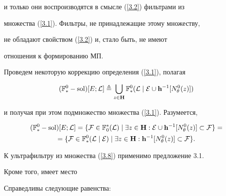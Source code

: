{и только они воспроизводятся в смысле (\ref{3.2}) фильтрами из


множества (\ref{3.1}). Фильтры, не принадлежащие этому множеству,


не обладают свойством (\ref{3.2}) и, стало быть, не имеют


отношения к формированию МП.





Проведем некоторую коррекцию определения (\ref{3.1}), полагая


\begin{equation}


\label{3.8}


({{\Bbb F}_*^0}-\sol)[E;{\cal L}] \triangleq


\bigcup\limits_{z \in {\bold H}}{{\Bbb F}_*^0}({\cal L}\mid{\cal


E}\cup{{\bold h}^{-1}}[{N_\theta^0}(z)])


\end{equation}


и получая при этом подмножество множества (\ref{3.1}). Разумеется,


\begin{multline}


\label{3.9}


({{\Bbb F}_*^0}-\sol)[E;{\cal L}] = \{{\cal F} \in {{\Bbb F}_0^*}({\cal


L}) \mid \exi{z} \in {\bold H}:{\cal E}\cup{{\bold h}^{-1}}[{N_\theta^0}(z)]


\subset {\cal F}\} =\\


= \{{\cal F} \in {{\Bbb F}_*^0}({\cal L}\mid{\cal E})


\mid \exi{z} \in {\bold H}:{{\bold h}^{-1}}[{N_\theta^0}(z)] \subset


{\cal F}\}.


\end{multline}


К ультрафильтру из множества (\ref{3.8}) применимо предложение 3.1.


Кроме того, имеет место








\begin{props}


Справедливы следующие равенства\/${:}$


\begin{multline}\label{3.10}



\end{multline}
\end{props}}

